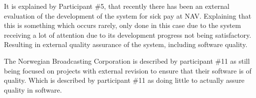 
It is explained by Participant \#5, that recently there has been an external evaluation of the development of the system for sick pay at NAV. Explaining that this is something which occurs rarely, only done in this case due to the system receiving a lot of attention due to its development progress not being satisfactory. Resulting in external quality assurance of the system, including software quality.


The Norwegian Broadcasting Corporation is described by participant \#11 as still being focused on projects with external revision to ensure that their software is of quality. Which is described by participant \#11 as doing little to actually assure quality in software.




